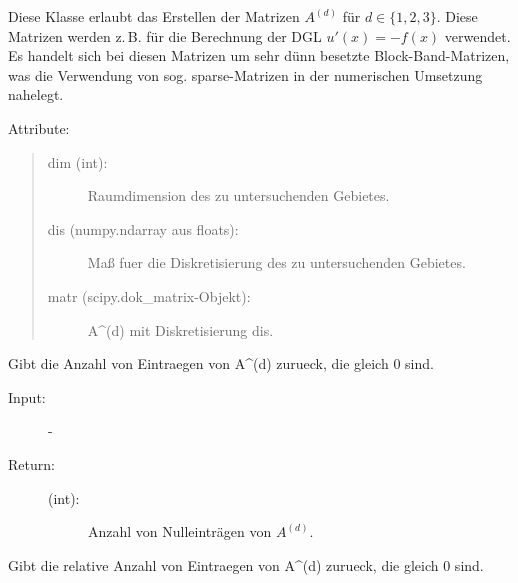 \documentclass[a4paper,10pt,ngerman, openright]{sphinxmanual}
\begin{document}
\begin{fulllineitems}
\label{\detokenize{index:sparse.Sparse}}
Diese Klasse erlaubt das Erstellen der Matrizen $A^{(d)}$ für $d\in \{ 1,2,3 \}$. Diese Matrizen werden
z.\,B. für die Berechnung der DGL $u'(x)=-f(x)$ verwendet. Es handelt sich bei diesen Matrizen
um sehr dünn besetzte Block-Band-Matrizen, was die Verwendung von sog. sparse-Matrizen
in der numerischen Umsetzung nahelegt.

Attribute:
\begin{quote}
\begin{description}
\item[{dim (int):}] \leavevmode
Raumdimension des zu untersuchenden Gebietes.

\item[{dis (numpy.ndarray aus floats):}] \leavevmode
Maß fuer die Diskretisierung des zu untersuchenden Gebietes.

\item[{matr (scipy.dok\_matrix-Objekt):}] \leavevmode
A\textasciicircum{}(d) mit Diskretisierung dis.

\end{description}
\end{quote}

\begin{fulllineitems}
\label{\detokenize{index:sparse.Sparse.anz_n_abs}}
Gibt die Anzahl von Eintraegen von A\textasciicircum{}(d) zurueck, die gleich 0 sind.

\begin{description}
\item[{Input:}] -\leavevmode
\item[{Return:}] \leavevmode\begin{description}
\item[{(int):}] \leavevmode
Anzahl von Nulleinträgen von $A^{(d)}$.

\end{description}

\end{description}

\end{fulllineitems}


\begin{fulllineitems}
\label{\detokenize{index:sparse.Sparse.anz_n_rel}}
Gibt die relative Anzahl von Eintraegen von A\textasciicircum{}(d) zurueck, die gleich 0 sind.


\end{fulllineitems}
\end{fulllineitems}
\end{document}
